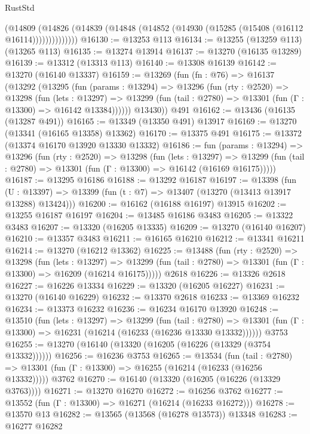 \begin{lexlean}{RustStd}
\begin{coremodule}
              (@14809
                (@14826 (@14839 (@14848 (@14852 (@14930 (@15285 (@15408 (@16112 @16114))))))))))))))
@16130 := @13253 @113
@16134 := @13255 (@13259 @113) (@13265 @113)
@16135 := @13274 @13914
@16137 := @13270 (@16135 @13289)
@16139 := @13312 (@13313 @113)
@16140 := @13308 @16139
@16142 := @13270 (@16140 @13337)
@16159 := @13269
    (fun (fn : @76) =>
    @16137
      (@13292
        (@13295
          (fun (params : @13294) =>
          @13296
            (fun (rty : @2520) =>
            @13298
              (fun (lets : @13297) =>
              @13299 (fun (tail : @2780) => @13301 (fun (Γ : @13300) => @16142 @13384))))))
        @13430))
    @491
@16162 := @13436 (@16135 (@13287 @491))
@16165 := @13349 (@13350 @491) @13917
@16169 := @13270 (@13341 (@16165 @13358) @13362)
@16170 := @13375 @491
@16175 := @13372 (@13374 @16170 @13920 @13330 @13332)
@16186 := fun (params : @13294) =>
  @13296
    (fun (rty : @2520) =>
    @13298
      (fun (lets : @13297) =>
      @13299 (fun (tail : @2780) => @13301 (fun (Γ : @13300) => @16142 (@16169 @16175)))))
@16187 := @13295 @16186
@16188 := @13292 @16187
@16197 := @13398
    (fun (U : @13397) => @13399 (fun (t : @7) => @13407 (@13270 (@13413 @13917 @13288) @13424)))
@16200 := @16162 (@16188 @16197) @13915
@16202 := @13255 @16187 @16197
@16204 := @13485 @16186 @3483
@16205 := @13322 @3483
@16207 := @13320 (@16205 @13335)
@16209 := @13270 (@16140 @16207)
@16210 := @13357 @3483
@16211 := @16165 @16210
@16212 := @13341 @16211
@16214 := @13270 (@16212 @13362)
@16225 := @13488
    (fun (rty : @2520) =>
    @13298
      (fun (lets : @13297) =>
      @13299 (fun (tail : @2780) => @13301 (fun (Γ : @13300) => @16209 (@16214 @16175)))))
    @2618
@16226 := @13326 @2618
@16227 := @16226 @13334
@16229 := @13320 (@16205 @16227)
@16231 := @13270 (@16140 @16229)
@16232 := @13370 @2618
@16233 := @13369 @16232
@16234 := @13373 @16232
@16236 := @16234 @16170 @13920
@16248 := @13510
    (fun (lets : @13297) =>
    @13299
      (fun (tail : @2780) =>
      @13301 (fun (Γ : @13300) => @16231 (@16214 (@16233 (@16236 @13330 @13332))))))
    @3753
@16255 := @13270 (@16140 (@13320 (@16205 (@16226 (@13329 (@3754 @13332))))))
@16256 := @16236 @3753
@16265 := @13534
    (fun (tail : @2780) => @13301 (fun (Γ : @13300) => @16255 (@16214 (@16233 (@16256 @13332)))))
    @3762
@16270 := @16140 (@13320 (@16205 (@16226 (@13329 @3763))))
@16271 := @13270 @16270
@16272 := @16256 @3762
@16277 := @13552 (fun (Γ : @13300) => @16271 (@16214 (@16233 @16272)))
@16278 := @13570 @13
@16282 := @13565 (@13568 (@16278 @13573)) @13348
@16283 := @16277 @16282

\end{coremodule}
\end{lexlean}
